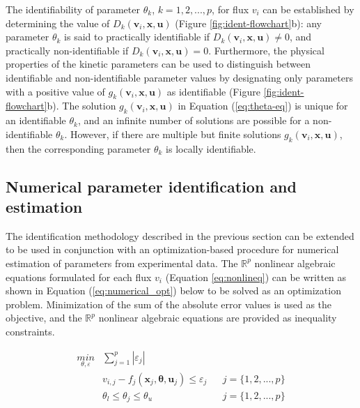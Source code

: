 \documentclass[10pt]{article}
\begin{document}
	The identifiability of parameter $\theta_k$, $k = {1, 2, ..., p}$, for flux $v_i$ can be established by determining the value of $D_k(\mathbf{v}_i, \mathbf{x}, \mathbf{u})$ (Figure \ref{fig:ident-flowchart}b): any parameter $\theta_k$ is said to practically identifiable if $D_k(\mathbf{v}_i, \mathbf{x}, \mathbf{u})\neq0$, and practically non-identifiable if $D_k(\mathbf{v}_i, \mathbf{x}, \mathbf{u}) = 0$. Furthermore, the physical properties of the kinetic parameters can be used to distinguish between identifiable and non-identifiable parameter values by designating only parameters with a positive value of $g_k(\mathbf{v}_i, \mathbf{x}, \mathbf{u})$ as identifiable (Figure \ref{fig:ident-flowchart}b). The solution $g_k(\mathbf{v}_i, \mathbf{x}, \mathbf{u})$ in Equation (\ref{eq:theta-eq}) is unique for an identifiable $\theta_k$, and an infinite number of solutions are possible for a non-identifiable $\theta_k$. However, if there are multiple but finite solutions $g_k(\mathbf{v}_i, \mathbf{x}, \mathbf{u})$, then the corresponding parameter $\theta_k$ is locally identifiable.
	
	\subsection{Numerical parameter identification and estimation}\label{sec:numerical_method}
	The identification methodology described in the previous section can be extended to be used in conjunction with an optimization-based procedure for numerical estimation of parameters from experimental data. The $\mathbb{R}^p$ nonlinear algebraic equations formulated for each flux $v_i$ (Equation \ref{eq:nonlineq}) can be written as shown in Equation (\ref{eq:numerical_opt}) below to be solved as an optimization problem. Minimization of the sum of the absolute error values is used as the objective, and the $\mathbb{R}^p$ nonlinear algebraic equations are provided as inequality constraints. 
	
	\begin{subequations}\label{eq:numerical_opt}
		\begin{align}
		\underset{\theta, \varepsilon}{min} & \sum_{j=1}^{p} \left|\varepsilon_j\right|\\
		& v_{i, j} - f_j(\mathbf{x}_j,\mathbf{\theta}, \mathbf{u}_j) \le \varepsilon_j && j=\{1, 2, ..., p\}\\
		& \theta_l \le \theta_j \le \theta_u && j=\{1, 2, ..., p\}
		\end{align}
	\end{subequations}	
\end{document}
